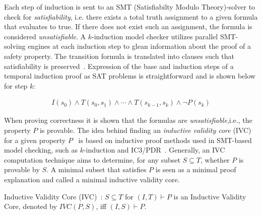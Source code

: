 Each step of induction is sent to an SMT (Satisfiabilty Modulo Theory)-solver to check for \emph{satisfiability}, i.e. there exists a total truth assignment to a given formula that evaluates to true. If there does not exist such an assignment, the formula is considered \emph{unsatisfiable}. %
A $\mathit{k}$-induction model checker utilizes parallel SMT-solving engines at each induction step to glean information about the proof of a safety property. The transition formula is translated into clauses such that satisfiability is preserved~\cite{een2003temporal}. Expression of the base and induction steps of a temporal induction proof as SAT problems is straightforward and is shown below for step $k$:

\begin{gather*}
I(s_0) \land T(s_0, s_1) \land \cdots \land T(s_{k-1}, s_{k})
\land \neg P(s_{k})
\end{gather*}

When proving correctness it is shown that the formulas are \emph{unsatisfiable},i.e., the property $P$ is provable. The idea behind finding an {\em inductive validity core} (IVC) for a given property $P$~\cite{GhassabaniGW16} is based on inductive proof methods used in SMT-based model checking, such as $\mathit{k}$-induction and IC3/PDR~\cite{een2011efficient, kahsai2012incremental, cook1971complexity}. Generally, an IVC computation technique aims to determine, for any subset $S \subseteq T$, whether $\mathit{P}$ is provable by $\mathit{S}$. A minimal subset that satisfies $\mathit{P}$ is seen as a minimal proof explanation and called a minimal inductive validity core. %

\begin{definition}
Inductive Validity Core (IVC)~\cite{GhassabaniGW16}: $S \subseteq T$ for $(I, T) \vdash P$ is an Inductive Validity Core, denoted by $\mathit{IVC(P,S)}$, iff $\mathit{(I,S)} \vdash P$.
\end{definition}

